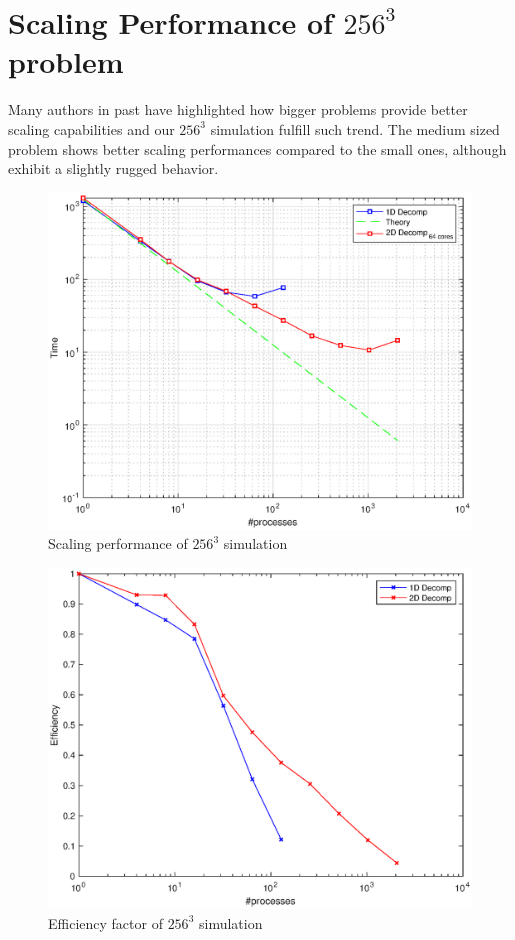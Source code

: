 \section{Scaling Performance of $256^{3}$ problem}
Many authors in past have highlighted how bigger problems provide better scaling capabilities and our $256^{3}$ simulation fulfill such trend.
The medium sized problem shows better scaling performances compared to the small ones, although exhibit a slightly rugged behavior.
\par
\begin{figure}
\begin{center}
\includegraphics[scale=0.6]{grafici/1281}
\caption{Scaling performance of $256^{3}$ simulation}
\label{1281}
\end{center}
\end{figure}

\begin{figure}
\begin{center}
\includegraphics[scale=0.6]{grafici/1283}
\caption{Efficiency factor of $256^{3}$ simulation}
\label{1283}
\end{center}
\end{figure}


